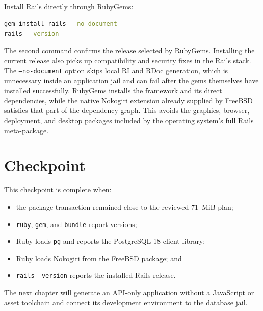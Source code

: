 Install Rails directly through RubyGems:

\begin{lstlisting}[language=sh]
gem install rails --no-document
rails --version
\end{lstlisting}

The second command confirms the release selected by RubyGems. Installing the
current release also picks up compatibility and security fixes in the Rails
stack. The \texttt{--no-document} option skips local RI and RDoc generation,
which is unnecessary inside an application jail and can fail after the gems
themselves have installed successfully. RubyGems installs the framework and
its direct dependencies, while the native Nokogiri extension already supplied
by FreeBSD satisfies that part of the dependency graph. This avoids the
graphics, browser, deployment, and desktop packages included by the operating
system's full Rails meta-package.

\section{Checkpoint}

This checkpoint is complete when:

\begin{itemize}
  \item the package transaction remained close to the reviewed 71~MiB plan;
  \item \texttt{ruby}, \texttt{gem}, and \texttt{bundle} report versions;
  \item Ruby loads \texttt{pg} and reports the PostgreSQL 18 client library;
  \item Ruby loads Nokogiri from the FreeBSD package; and
  \item \texttt{rails --version} reports the installed Rails release.
\end{itemize}

The next chapter will generate an API-only application without a JavaScript or
asset toolchain and connect its development environment to the database jail.
